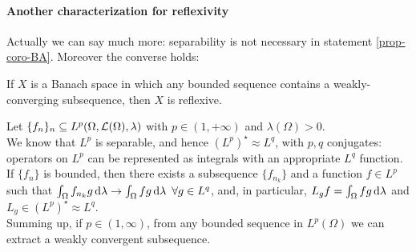 \paragraph{Another characterization for reflexivity} Actually we can say much more: separability is not necessary in statement \vref{prop-coro-BA}. Moreover the converse holds:
\begin{theo} \label{theo-eberlin-smulian}
	If $X$ is a Banach space in which any bounded sequence contains a weakly-converging subsequence, then $X$ is reflexive.
\end{theo}

	Let $\{f_n\}_n \subseteq L^p(\Omega, \mathcal L(\Omega), \lambda)$ with $p \in (1,+\infty)$ and $\lambda(\Omega) > 0$.\\
	We know that $L^p$ is separable, and hence $(L^p)^\star \approx L^q$, with $p,q$ conjugates: operators on $L^p$ can be represented as integrals with an appropriate $L^q$ function.\\
	If $\{f_n\}$ is bounded, then there exists a subsequence $\{f_{n_k}\}$ and a function $f \in L^p$ such that $\int_\Omega f_{n_k} g \,\mathrm d \lambda \to \int_\Omega fg \,\mathrm d \lambda \enspace \forall g \in L^q$, and, in particular, $L_g f = \int_\Omega fg \,\mathrm d \lambda$ and $L_g \in (L^p)^\star \approx L^q$.\\
	Summing up, if $p\in(1,\infty)$, from any bounded sequence in $L^p(\Omega)$ we can extract a weakly convergent subsequence.
%
%
%	
